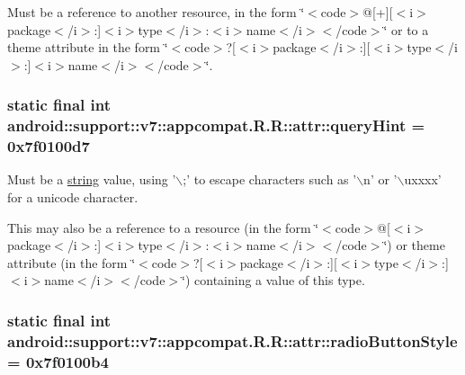 Must be a reference to another resource, in the form \char`\"{}$<$code$>$@\mbox{[}+\mbox{]}\mbox{[}$<$i$>$package$<$/i$>$:\mbox{]}$<$i$>$type$<$/i$>$:$<$i$>$name$<$/i$>$$<$/code$>$\char`\"{} or to a theme attribute in the form \char`\"{}$<$code$>$?\mbox{[}$<$i$>$package$<$/i$>$:\mbox{]}\mbox{[}$<$i$>$type$<$/i$>$:\mbox{]}$<$i$>$name$<$/i$>$$<$/code$>$\char`\"{}. \hypertarget{classandroid_1_1support_1_1v7_1_1appcompat_1_1_r_1_1attr_46dd1b7cc6544c3020f418699e76fe7d}{
\subsubsection[{queryHint}]{\setlength{\rightskip}{0pt plus 5cm}static final int android::support::v7::appcompat.R.R::attr::queryHint = 0x7f0100d7}}
\label{classandroid_1_1support_1_1v7_1_1appcompat_1_1_r_1_1attr_46dd1b7cc6544c3020f418699e76fe7d}


Must be a \hyperlink{classandroid_1_1support_1_1v7_1_1appcompat_1_1_r_1_1string}{string} value, using '$\backslash$;' to escape characters such as '$\backslash$n' or '$\backslash$uxxxx' for a unicode character. 

This may also be a reference to a resource (in the form \char`\"{}$<$code$>$@\mbox{[}$<$i$>$package$<$/i$>$:\mbox{]}$<$i$>$type$<$/i$>$:$<$i$>$name$<$/i$>$$<$/code$>$\char`\"{}) or theme attribute (in the form \char`\"{}$<$code$>$?\mbox{[}$<$i$>$package$<$/i$>$:\mbox{]}\mbox{[}$<$i$>$type$<$/i$>$:\mbox{]}$<$i$>$name$<$/i$>$$<$/code$>$\char`\"{}) containing a value of this type. \hypertarget{classandroid_1_1support_1_1v7_1_1appcompat_1_1_r_1_1attr_1b42cbb70f5dab8706e3e8eacb09d60f}{
\subsubsection[{radioButtonStyle}]{\setlength{\rightskip}{0pt plus 5cm}static final int android::support::v7::appcompat.R.R::attr::radioButtonStyle = 0x7f0100b4}}
\label{classandroid_1_1support_1_1v7_1_1appcompat_1_1_r_1_1attr_1b42cbb70f5dab8706e3e8eacb09d60f}


